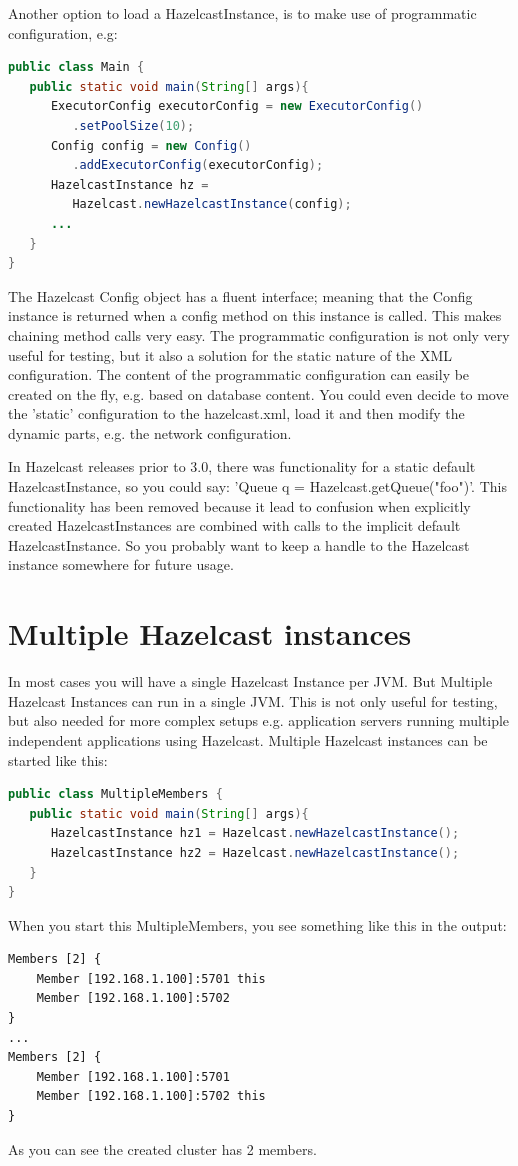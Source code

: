 Another option to load a HazelcastInstance, is to make use of programmatic configuration, e.g: 
\begin{lstlisting}[language=java]
public class Main {
   public static void main(String[] args){
      ExecutorConfig executorConfig = new ExecutorConfig()
         .setPoolSize(10);
      Config config = new Config()
         .addExecutorConfig(executorConfig);	  
      HazelcastInstance hz = 
         Hazelcast.newHazelcastInstance(config);
      ...
   }
}
\end{lstlisting}
The Hazelcast Config object has a fluent interface; meaning that the Config instance is returned when a config method on this instance is called. This makes chaining method calls very easy. The programmatic configuration is not only very useful for testing, but it also a solution for the static nature of the XML configuration. The content of the programmatic configuration can easily be created on the fly, e.g. based on database content. You could even decide to move the 'static' configuration to the hazelcast.xml, load it and then modify the dynamic parts, e.g. the network configuration.

In Hazelcast releases prior to 3.0, there was functionality for a static default HazelcastInstance, so you could say: 'Queue q = Hazelcast.getQueue("foo")'. This functionality has been removed because it lead to confusion when explicitly created HazelcastInstances are combined with calls to the implicit default HazelcastInstance. So you probably want to keep a handle to the Hazelcast instance somewhere for future usage.

\section{Multiple Hazelcast instances}
In most cases you will have a single Hazelcast Instance per JVM. But Multiple Hazelcast Instances can run in a single JVM. This is not only useful for testing, but also needed for more complex setups e.g. application servers running multiple independent applications using Hazelcast. Multiple Hazelcast instances can be started like this:
\begin{lstlisting}[language=java]
public class MultipleMembers {
   public static void main(String[] args){
      HazelcastInstance hz1 = Hazelcast.newHazelcastInstance();
      HazelcastInstance hz2 = Hazelcast.newHazelcastInstance();
   }
}
\end{lstlisting}
When you start this MultipleMembers, you see something like this in the output:
\begin{lstlisting}
Members [2] {
    Member [192.168.1.100]:5701 this
    Member [192.168.1.100]:5702
}
...
Members [2] {
    Member [192.168.1.100]:5701
    Member [192.168.1.100]:5702 this
}
\end{lstlisting}
As you can see the created cluster has 2 members.

